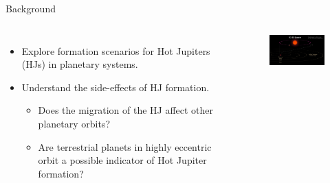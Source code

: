 \documentclass{beamer}
\begin{document}
\begin{frame}{Background}
    \begin{columns}
        \begin{itemize}
            \item Explore formation scenarios for Hot Jupiters (HJs) in planetary
                systems.
            \item Understand the side-effects of HJ formation.
                \begin{itemize}
                    \item Does the migration of the HJ affect other planetary orbits?
                    \item Are terrestrial planets in highly eccentric orbit a possible
                        indicator of Hot Jupiter formation?
                \end{itemize}
        \end{itemize} 
            \begin{figure}
                \centering
                \includegraphics[width=1.66in]{hj_orbit}
            \end{figure}
    \end{columns}
\end{frame}
\end{document}
